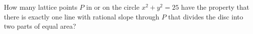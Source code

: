How many lattice points $P$ in or on the circle $x^2+y^2=25$ have the property that there is exactly one line with rational slope through $P$ that divides the disc into two parts of equal area?
